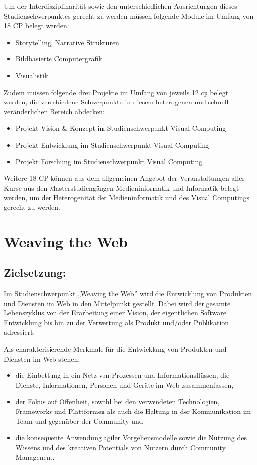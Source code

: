 Um der Interdisziplinarität sowie den unterschiedlichen Ausrichtungen
dieses Studienschwerpunktes gerecht zu werden müssen folgende Module im
Umfang von 18 CP belegt werden:

\begin{itemize}
\tightlist
\item
  Storytelling, Narrative Strukturen
\item
  Bildbasierte Computergrafik
\item
  Visualistik
\end{itemize}

Zudem müssen folgende drei Projekte im Umfang von jeweils 12 cp belegt
werden, die verschiedene Schwerpunkte in diesem heterogenen und schnell
veränderlichen Bereich abdecken:

\begin{itemize}
\tightlist
\item
  Projekt Vision \& Konzept im Studienschwerpunkt Visual Computing
\item
  Projekt Entwicklung im Studienschwerpunkt Visual Computing
\item
  Projekt Forschung im Studienschwerpunkt Visual Computing
\end{itemize}

Weitere 18 CP können aus dem allgemeinen Angebot der Veranstaltungen
aller Kurse aus den Masterstudiengängen Medieninformatik und Informatik
belegt werden, um der Heterogenität der Medieninformatik und des Visual
Computings gerecht zu werden.

\chapter{Weaving the Web}\label{weaving-the-web}

\section*{Zielsetzung:}\label{zielsetzung-1}

Im Studienschwerpunkt „Weaving the Web'' wird die Entwicklung von
Produkten und Diensten im Web in den Mittelpunkt gestellt. Dabei wird
der gesamte Lebenszyklus von der Erarbeitung einer Vision, der
eigentlichen Software Entwicklung bis hin zu der Verwertung als Produkt
und/oder Publikation adressiert.

Als charakterisierende Merkmale für die Entwicklung von Produkten und
Diensten im Web stehen:

\begin{itemize}
\tightlist
\item
  die Einbettung in ein Netz von Prozessen und Informationsflüssen, die
  Dienste, Informationen, Personen und Geräte im Web zusammenfassen,
\item
  der Fokus auf Offenheit, sowohl bei den verwendeten Technologien,
  Frameworks und Plattformen als auch die Haltung in der Kommunikation
  im Team und gegenüber der Community und
\item
  die konsequente Anwendung agiler Vorgehensmodelle sowie die Nutzung
  des Wissens und des kreativen Potentials von Nutzern durch Community
  Managenent.
\end{itemize}

